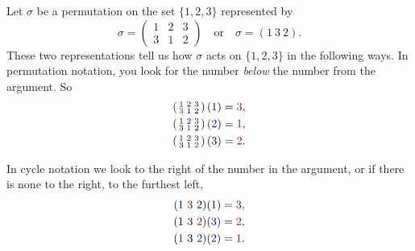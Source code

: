 \documentclass{ximera}
\begin{document}
\begin{example}
  Let $\sigma$ be a permutation on the set $\{1,2,3\}$ represented by
  \[
  \sigma = \left(\begin{smallmatrix}
    1 & 2 & 3 \\
    3 & 1 & 2
  \end{smallmatrix}\right)
  \quad\text{or}\quad \sigma = (1 \ 3 \ 2).
  \]
  These two representations tell us how $\sigma$ acts on $\{1,2,3\}$
  in the following ways. In permutation notation, you look for the
  number \textit{below} the number from the argument. So
  \begin{align*}
    \left(\begin{smallmatrix}
    \textcolor{blue!60!black}1 & 2 & 3 \\
    \textcolor{red!60!black}{3} & 1 & 2
    \end{smallmatrix}\right) (\textcolor{blue!60!black}1) &= \textcolor{red!60!black}{3}, \\
    \left(\begin{smallmatrix}
    1 & \textcolor{blue!60!black}2 & 3 \\
    3 & \textcolor{red!60!black}{1} & 2
    \end{smallmatrix}\right) (\textcolor{blue!60!black}2) &= \textcolor{red!60!black}{1}, \\
    \left(\begin{smallmatrix}
    1 & 2 & \textcolor{blue!60!black}3 \\
    3 & 1 & \textcolor{red!60!black}{2}
    \end{smallmatrix}\right) (\textcolor{blue!60!black}3) &= \textcolor{red!60!black}{2}.
  \end{align*}

  In cycle notation we look to the right of the number in the
  argument, or if there is none to the right, to the furthest left,
  \begin{align*}
    ( \textcolor{blue!60!black}1\  \textcolor{red!60!black}{3}\  2) (\textcolor{blue!60!black}1) &= \textcolor{red!60!black}{3}, \\
    ( 1\  \textcolor{blue!60!black}{3}\   \textcolor{red!60!black}2) (\textcolor{blue!60!black}3) &= \textcolor{red!60!black}{2}, \\
    ( \textcolor{red!60!black}1\  3\   \textcolor{blue!60!black}2) (\textcolor{blue!60!black}2)   &= \textcolor{red!60!black}{1}.
  \end{align*}
\end{example}
\end{document}
